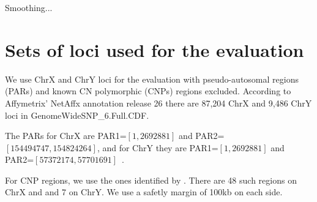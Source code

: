 \documentclass[10pt,a4paper]{article}
\newcommand{\GWSSixf}{GenomeWideSNP\_6\xspace}
\newcommand{\citet}[1]{\cite{#1}}
\begin{document}
Smoothing...


\clearpage
\section{Sets of loci used for the evaluation}

We use ChrX and ChrY loci for the evaluation with pseudo-autosomal regions (PARs) and known CN polymorphic (CNPs) regions excluded.  
According to Affymetrix' NetAffx annotation release 26 there are 87,204 ChrX and 9,486 ChrY loci in \GWSSixf.Full.CDF.

The PARs for ChrX are PAR1=$[1,2692881]$ and PAR2=$[154494747,154824264]$, and for ChrY they are PAR1=$[1,2692881]$ and PAR2=$[57372174,57701691]$~\citet{BlaschkeRappold_2006}.

For CNP regions, we use the ones identified by \citet{RedonR_etal_2006}.  There are 48 such regions on ChrX and and 7 on ChrY.  We use a safetly margin of 100kb on each side.
\end{document}
